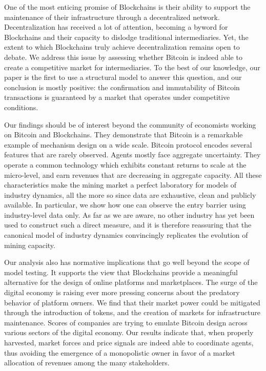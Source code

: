 \documentclass[12pt, a4paper]{article}
\makeatletter
\renewcommand{\section}{\@startsection{section}{2}{0mm}{-0.8\baselineskip}{.5\baselineskip}{\normalfont\large\bfseries}}
\makeatother
\begin{document}
\section{Conclusion}

\label{sec:conclusion}


One of the most enticing promise of Blockchains
is their ability to support the maintenance of their infrastructure
through a decentralized network. Decentralization
has received a lot of attention, becoming a byword for Blockchains and their
capacity to dislodge traditional intermediaries. Yet, the extent to which Blockchains
truly achieve decentralization remains open to debate. We address this issue
by assessing whether Bitcoin is indeed able to
create a competitive market for intermediaries. To the best of our knowledge, our paper
is the first to use a structural model to answer this question, and our conclusion is mostly positive:
the confirmation and immutability of Bitcoin transactions is
guaranteed by a market that operates under competitive conditions.

Our findings should be of interest beyond the community of economists
working on Bitcoin and Blockchains. They demonstrate that Bitcoin
is a remarkable example of mechanism design on a wide scale. Bitcoin protocol encodes several features that are
rarely observed. Agents mostly face
aggregate uncertainty. They operate a common technology which exhibits constant
returns to scale at the micro-level, and earn revenues that are decreasing
in aggregate capacity. All these characteristics make the mining market
a perfect laboratory for models of industry dynamics, all the more so since data are exhaustive, clean and
publicly available. In particular, we show how one can observe the
entry barrier using industry-level data only. As far as we are aware, no other industry
has yet been used to construct such a direct measure,
and it is therefore reassuring that the canonical model of industry dynamics
convincingly replicates the evolution of mining capacity.

Our analysis also has normative implications that go well beyond the scope of model testing.
It supports the view that Blockchains provide
a meaningful alternative for the design of online platforms and marketplaces.
The surge of the digital economy is raising ever more pressing concerns about the predatory behavior
of platform owners. We find that their market power could be mitigated through the
introduction of tokens, and the creation of markets for infrastructure maintenance.
Scores of companies are trying to emulate Bitcoin design across various sectors of the
digital economy. Our results indicate that, when properly harvested, market forces and price signals
are indeed able to coordinate agents, thus avoiding the emergence of a monopolistic owner
in favor of a market allocation of revenues among the many stakeholders.
\end{document}
